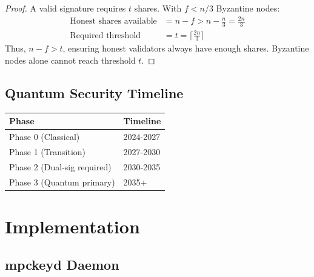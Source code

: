 \documentclass[11pt]{article}
\begin{document}
\begin{proof}
A valid signature requires $t$ shares. With $f < n/3$ Byzantine nodes:
\begin{align}
\text{Honest shares available} &= n - f > n - \frac{n}{3} = \frac{2n}{3} \\
\text{Required threshold} &= t = \lceil \frac{2n}{3} \rceil
\end{align}
Thus, $n - f > t$, ensuring honest validators always have enough shares. Byzantine nodes alone cannot reach threshold $t$.
\end{proof}

\subsection{Quantum Security Timeline}

\begin{table}[h]
\centering
\begin{tabular}{@{}ll@{}}
\toprule
\textbf{Phase} & \textbf{Timeline} \\
\midrule
Phase 0 (Classical) & 2024-2027 \\
Phase 1 (Transition) & 2027-2030 \\
Phase 2 (Dual-sig required) & 2030-2035 \\
Phase 3 (Quantum primary) & 2035+ \\
\bottomrule
\end{tabular}

\label{tab:quantum-timeline}
\end{table}

\section{Implementation}

\subsection{mpckeyd Daemon}
\end{document}
